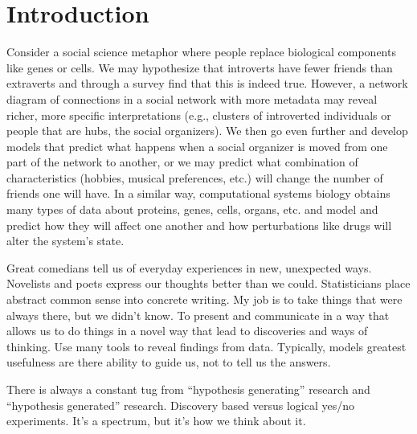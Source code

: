 
\chapter{Introduction}\label{chapter:intro}




Consider a social science metaphor where people replace biological 
components like genes or cells. We may hypothesize that 
introverts have fewer friends than extraverts and through 
a survey find that this is indeed true. However, a network 
diagram of connections in a social network with more metadata 
may reveal richer, more specific interpretations (e.g., 
clusters of introverted individuals or people that are 
hubs, the social organizers). We then go even further 
and develop models that predict what happens when a 
social organizer is moved from one part of the network to 
another, or we may predict what combination of characteristics 
(hobbies, musical preferences, etc.) will change the number 
of friends one will have. In a similar way, computational 
systems biology obtains many types of data about proteins, 
genes, cells, organs, etc. and model and predict how they 
will affect one another and how perturbations like drugs 
will alter the system’s state.




Great comedians tell us of everyday experiences in new, 
unexpected ways. Novelists and poets express our thoughts 
better than we could. Statisticians place abstract common 
sense into concrete writing. My job is to take things that 
were always there, but we didn’t know. To present and 
communicate in a way that allows us to do things in a 
novel way that lead to discoveries and ways of thinking.  
Use many tools to reveal findings from data. Typically, 
models greatest usefulness are there ability to guide us, 
not to tell us the answers.


There is always a constant tug from “hypothesis generating” 
research and “hypothesis generated” research. Discovery 
based versus logical yes/no experiments. It’s a spectrum, 
but it’s how we think about it.








